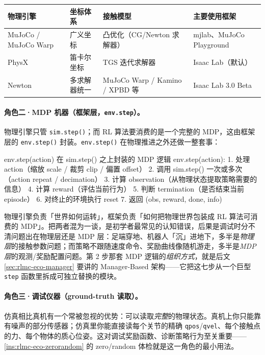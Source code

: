 \begin{center}
\small
\begin{tabular}{@{}llll@{}}
\toprule
物理引擎 & 坐标体系 & 接触模型 & 主要使用框架 \\
\midrule
MuJoCo / MuJoCo Warp & 广义坐标 & 凸优化（CG/Newton 求解器） & mjlab、MuJoCo Playground \\
PhysX & 笛卡尔坐标 & TGS 迭代求解器 & Isaac Lab（默认） \\
Newton & 多求解器统一 & MuJoCo Warp / Kamino / XPBD 等 & Isaac Lab 3.0 Beta \\
\bottomrule
\end{tabular}
\end{center}

\paragraph{角色二·MDP 机器（框架层，\texttt{env.step}）。}物理引擎只管 \verb|sim.step()|；而 RL 算法要消费的是一个完整的 MDP，这由框架层的 \verb|env.step()| 封装。\verb|env.step()| 在物理推进之外还做一整套事：

\begin{codebox}[text]{env.step(action) 在 sim.step() 之上封装的 MDP 逻辑}
env.step(action):
    1. 处理 action（缩放 scale / 裁剪 clip / 偏置 offset）
    2. 调用 sim.step() 一次或多次（action repeat / decimation）
    3. 计算 observation（从物理状态提取策略需要的信息）
    4. 计算 reward（评估当前行为）
    5. 判断 termination（是否结束当前 episode）
    6. 对终止的环境执行 reset
    7. 返回 (obs, reward, done, info)
\end{codebox}

\begin{insight}\label{ins:rlmc-eco-simenv}
物理引擎负责「世界如何运转」，框架负责「如何把物理世界包装成 RL 算法可消费的 MDP」。把两者混为一谈，是初学者最常见的认知错误，后果是调试时分不清问题出在物理层还是 MDP 层：足端穿地、机器人「沉」进地下，多半是\emph{物理层}的接触参数问题；而策略不跟随速度命令、奖励曲线像随机游走，多半是\emph{MDP 层}的观测/奖励配置问题。第 2 步那套 MDP 逻辑的\emph{组织方式}，就是后文 \cref{sec:rlmc-eco-manager} 要讲的 Manager-Based 架构——它把这七步从一个巨型 \verb|step| 函数里拆成可独立替换的模块。
\end{insight}

\paragraph{角色三·调试仪器（ground-truth 读取）。}仿真相比真机有一个常被忽视的优势：可以读取\emph{完整}的物理状态。真机上你只能靠有噪声的部分传感器；仿真里你能直接读每个关节的精确 \verb|qpos|/\verb|qvel|、每个接触点的力、每个物体的质心位姿。这对调试奖励函数、诊断策略行为至关重要——\cref{ins:rlmc-eco-zerorandom} 的 zero/random 体检就是这一角色的最小用法。


